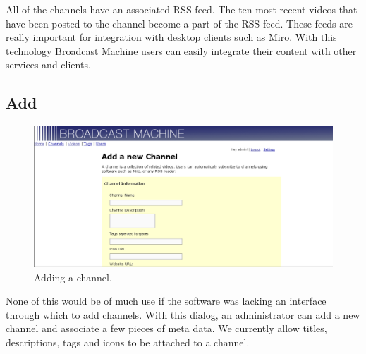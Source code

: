 \documentclass[a4paper,12pt]{report}
\begin{document}
All of the channels have an associated RSS feed.
The ten most recent videos that have been posted to the channel become a part of the RSS feed.
These feeds are really important for integration with desktop clients such as Miro.
With this technology Broadcast Machine users can easily integrate their content with other services and clients.

\subsection{Add}
\begin{figure}[h]
\begin{center}
\includegraphics[width=150mm]{./images/channeladd.png}
\end{center}
\caption{Adding a channel.}
\end{figure}

None of this would be of much use if the software was lacking an interface through which to add channels.
With this dialog, an administrator can add a new channel and associate a few pieces of meta data.
We currently allow titles, descriptions, tags and icons to be attached to a channel.
\end{document}

